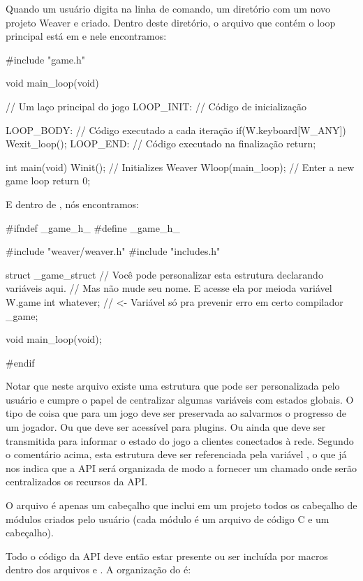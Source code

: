 

Quando um usuário digita  na linha de
comando, um diretório com um novo projeto Weaver e criado. Dentro
deste diretório, o arquivo que contém o loop principal está
em  e nele encontramos:

\alinhaverbatim
#include "game.h"

void main_loop(void){ // Um laço principal do jogo
 LOOP_INIT: // Código de inicialização 

 LOOP_BODY: // Código executado a cada iteração
    if(W.keyboard[W_ANY])
        Wexit_loop();
 LOOP_END: // Código executado na finalização
    return;
}

int main(void){
  Winit(); // Initializes Weaver
  Wloop(main_loop); // Enter a new game loop
  return 0;
}
\alinhanormal

E dentro de , nós encontramos:

\linha
\alinhaverbatim
#ifndef _game_h_
#define _game_h_

#include "weaver/weaver.h"
#include "includes.h"

struct _game_struct{
  // Você pode personalizar esta estrutura declarando variáveis aqui.
  // Mas não mude seu nome. E acesse ela por meioda variável W.game
  int whatever; // <- Variável só pra prevenir erro em certo compilador
} _game;

void main_loop(void);

#endif
\alinhanormal
\linha

Notar que neste arquivo existe uma estrutura que pode ser
personalizada pelo usuário e cumpre o papel de centralizar algumas
variáveis com estados globais. O tipo de coisa que para um jogo deve
ser preservada ao salvarmos o progresso de um jogador. Ou que deve ser
acessível para plugins. Ou ainda que deve ser transmitida para
informar o estado do jogo a clientes conectados à rede. Segundo o
comentário acima, esta estrutura deve ser referenciada pela
variável , o que já nos indica que a API será
organizada de modo a fornecer um 
chamado  onde serão centralizados os recursos da API.

O arquivo  é apenas um cabeçalho que inclui em
um projeto todos os cabeçalho de módulos criados pelo usuário (cada
módulo é um arquivo de código C e um cabeçalho).

Todo o código da API deve então estar presente ou ser incluída por
macros dentro dos arquivos 
e . A organização do  é:

